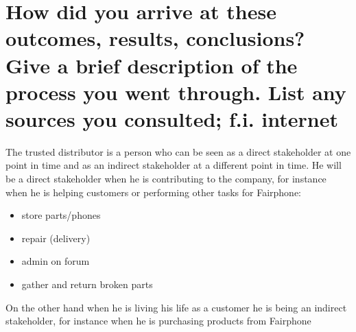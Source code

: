 \section{How did you arrive at these outcomes, results, conclusions? Give a brief description of the process you went through. List any sources you consulted; f.i. internet}

The trusted distributor is a person who can be seen as a direct stakeholder at one point in time and as an indirect stakeholder at a different point in time. He will be a direct stakeholder when he is contributing to the company, for instance when he is helping customers or performing other tasks for Fairphone: 	

\begin{itemize}
	\item store parts/phones
	\item repair (delivery)
	\item admin on forum
	\item gather and return broken parts

\end{itemize}
On the other hand when he is living his life as a customer he is being an indirect stakeholder, for instance when he is purchasing products from Fairphone 
